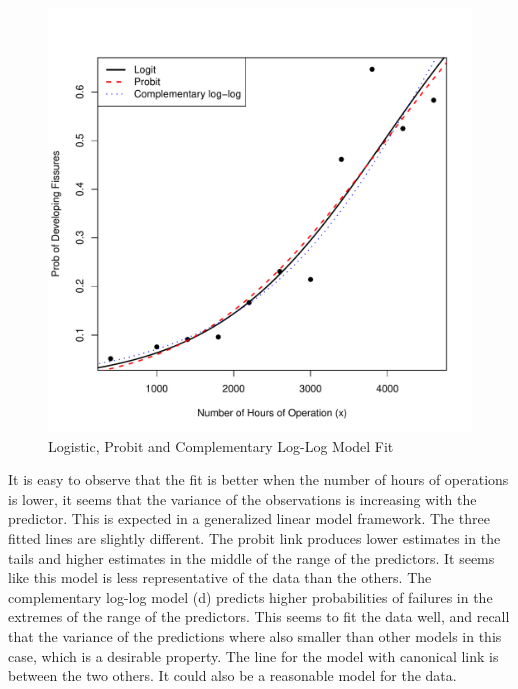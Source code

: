 \begin{solution}{5.9}
\begin{enumerate}
\begin{figure}[htbp]
\begin{center}
\begin{knitrout}
\color{fgcolor}
\includegraphics[width=\maxwidth]{figure/unnamed-chunk-85-1}

\end{knitrout}
\end{center}
\caption{Logistic, Probit and Complementary Log-Log Model Fit} \label{fig:glm:modfit}
\end{figure}

It is easy to observe that the fit is better when the number of hours of operations is lower, it seems that the variance of the observations is increasing with the predictor. This is expected in a generalized linear model framework. The three fitted lines are slightly different. The probit link produces lower estimates in the tails and higher estimates in the middle of the range of the predictors. It seems like this model is less representative of the data than the others. The complementary log-log model (d) predicts higher probabilities of failures in the extremes of the range of the predictors. This seems to fit the data well, and recall that the variance of the predictions where also smaller than other models in this case, which is a desirable property. The line for the model with canonical link is between the two others. It could also be a reasonable model for the data.

\end{enumerate}
\end{solution}
